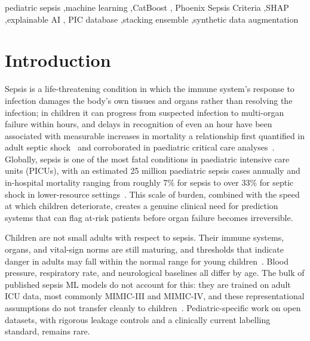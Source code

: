 \documentclass[final,3p,times]{elsarticle}
\begin{document}
\begin{frontmatter}
\begin{keyword}
pediatric sepsis \sep machine learning \sep CatBoost \sep
Phoenix Sepsis Criteria \sep SHAP \sep explainable AI \sep
PIC database \sep stacking ensemble \sep synthetic data augmentation
\end{keyword}

\end{frontmatter}

\linenumbers
\section{Introduction}
\label{sec:literature_review}

Sepsis is a life-threatening condition in which the immune
system's response to infection damages the body's own tissues and
organs rather than resolving the infection; in children it can
progress from suspected infection to multi-organ failure within
hours, and delays in recognition of even an hour have been
associated with measurable increases in mortality  a
relationship first quantified in adult septic shock~\cite{kumar2006}
and corroborated in paediatric critical care analyses~\cite{schlapbach2024}.
Globally, sepsis is one of the most fatal conditions in paediatric
intensive care units (PICUs), with an estimated 25 million
paediatric sepsis cases annually and in-hospital mortality ranging
from roughly 7\% for sepsis to over 33\% for septic shock in
lower-resource settings~\cite{sanchezpinto2024, schlapbach2024}. This scale of
burden, combined with the speed at which children deteriorate,
creates a genuine clinical need for prediction systems that can
flag at-risk patients before organ failure becomes irreversible.

Children are not small adults with respect to sepsis. Their
immune systems, organs, and vital-sign norms are still maturing,
and thresholds that indicate danger in adults may fall within the
normal range for young children~\cite{sanchezpinto2024}. Blood
pressure, respiratory rate, and neurological baselines all differ
by age. The bulk of published sepsis ML models do not account for
this: they are trained on adult ICU data, most commonly
MIMIC-III and MIMIC-IV, and these representational assumptions do
not transfer cleanly to children~\cite{le2019, yang2023}.
Pediatric-specific work on open datasets, with rigorous leakage
controls and a clinically current labelling standard, remains rare.
\end{document}
